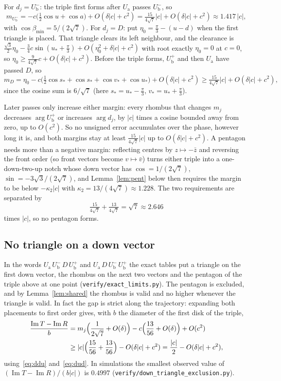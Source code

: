 \documentclass[11pt]{amsart}
\theoremstyle{definition}
\newcommand{\Ua}{U_{\mathrm a}}
\newcommand{\Ub}{U_{\mathrm b}}
\newcommand{\up}[1]{#1^{+}}
\newcommand{\dn}[1]{#1^{-}}
\DeclareMathOperator{\Imag}{Im}
\begin{document}
For $d_j=\dn{\Ub}$: the triple first forms after $\Ua$ passes $\dn{\Ub}$, so
\begin{equation}\label{eq:ddu}
m_{\dn{\Ub}}=-c\bigl(\tfrac12\cos u+\cos a\bigr)+O(\delta|c|+c^2)=\tfrac{15}{4\sqrt7}|c|+O(\delta|c|+c^2)\approx1.417\,|c|,
\end{equation}
with $\cos\beta_{\min}=5/(2\sqrt7)$. For $d_j=D$: put $\eta_0=\tfrac\pi3-(u-d)$ when the first triangle is
placed. That triangle clears its left neighbour, and the clearance is
$\tfrac{\sqrt3}2\eta_0-\tfrac34c\sin(u_*+\tfrac\pi3)+O(\eta_0^2+\delta|c|+c^2)$ with root exactly $\eta_0=0$ at
$c=0$, so $\eta_0\ge\tfrac{9}{4\sqrt7}c+O(\delta|c|+c^2)$. Before the triple forms, $\up{\Ub}$ and then $\Ua$
have passed $D$, so
\begin{equation}\label{eq:dud}
m_D=\eta_0-c\bigl(\tfrac12\cos s_*+\cos s_*+\cos v_*+\cos u_*\bigr)+O(\delta|c|+c^2)
\ge\tfrac{15}{4\sqrt7}|c|+O(\delta|c|+c^2),
\end{equation}
since the cosine sum is $6/\sqrt7$ (here $s_*=u_*-\tfrac\pi3$, $v_*=u_*+\tfrac\pi3$).

Later passes only increase either margin: every rhombus that changes $m_j$ decreases $\arg\up{\Ub}$ or
increases $\arg d_j$, by $|c|$ times a cosine bounded away from zero, up to $O(c^2)$. So no unsigned error
accumulates over the phase, however long it is, and both margins stay at least $\tfrac{15}{4\sqrt7}|c|$ up to
$O(\delta|c|+c^2)$. A pentagon needs more than a negative margin: reflecting centres by $z\mapsto-\bar z$ and
reversing the front order (so front vectors become $v\mapsto\bar v$) turns either triple into a
one-down-two-up notch whose down vector has $\cos=1/(2\sqrt7)$, $\sin=-3\sqrt3/(2\sqrt7)$, and
Lemma~\ref{lem:pent} below then requires the margin to be below $-\kappa_2|c|$ with
$\kappa_2=13/(4\sqrt7)\approx1.228$. The two requirements are separated by
\[
\tfrac{15}{4\sqrt7}+\tfrac{13}{4\sqrt7}=\sqrt7\approx2.646
\]
times $|c|$, so no pentagon forms.

\subsection{No triangle on a down vector} In the words $\Ua\,\dn{\Ub}\,D\,\up{\Ub}$ and $\Ua\,D\,\dn{\Ub}\,\up{\Ub}$
the exact tables put a triangle on the first down vector, the rhombus on the next two vectors and the
pentagon of the triple above at one point (\texttt{verify/exact\_limits.py}). The pentagon is excluded, and
by Lemma~\ref{lem:shared} the rhombus is valid and no higher whenever the triangle is valid. In fact the
gap is strict along the trajectory: expanding both placements to first order gives, with $b$ the diameter
of the first disk of the triple,
\[
\begin{aligned}
\frac{\Imag T-\Imag R}{b}&=m_j\Bigl(\frac1{2\sqrt7}+O(\delta)\Bigr)-c\Bigl(\frac{13}{56}+O(\delta)\Bigr)+O(c^2)\\
&\ge|c|\Bigl(\frac{15}{56}+\frac{13}{56}\Bigr)-O(\delta|c|+c^2)=\frac{|c|}2-O(\delta|c|+c^2),
\end{aligned}
\]
using~\eqref{eq:ddu} and~\eqref{eq:dud}. In simulations the smallest observed value of
$(\Imag T-\Imag R)/(b|c|)$ is $0.4997$ (\texttt{verify/down\_triangle\_exclusion.py}).
\end{document}
